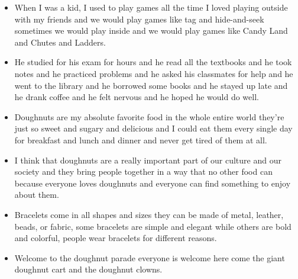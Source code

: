 \documentclass[letterpaper, 17pt]{article}
\begin{document}
\begin{itemize}
	\item When I was a kid, I used to play games all the time I loved playing outside with my friends and we would play games like tag and hide-and-seek sometimes we would play inside and we would play games like Candy Land and Chutes and Ladders.	%
	\item He studied for his exam for hours and he read all the textbooks and he took notes and he practiced problems and he asked his classmates for help and he went to the library and he borrowed some books and he stayed up late and he drank coffee and he felt nervous and he hoped he would do well.	%
	\item Doughnuts are my absolute favorite food in the whole entire world they're just so sweet and sugary and delicious and I could eat them every single day for breakfast and lunch and dinner and never get tired of them at all.	%
	\item I think that doughnuts are a really important part of our culture and our society and they bring people together in a way that no other food can because everyone loves doughnuts and everyone can find something to enjoy about them.	%
	\item Bracelets come in all shapes and sizes they can be made of metal, leather, beads, or fabric, some bracelets are simple and elegant while others are bold and colorful, people wear bracelets for different reasons.	%
	\item Welcome to the doughnut parade everyone is welcome here come the giant doughnut cart and the doughnut clowns.	%
\end{itemize}
\end{document}

